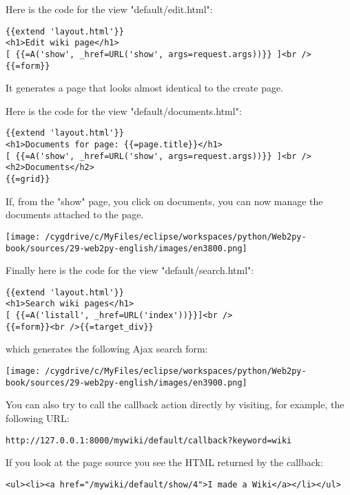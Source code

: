 \documentclass[justified,sixbynine,notoc]{tufte-book}
\begin{document}
\begin{fullwidth}
Here is the code for the view "default/edit.html":
\begin{lstlisting}[keywords={}]
{{extend 'layout.html'}}
<h1>Edit wiki page</h1>
[ {{=A('show', _href=URL('show', args=request.args))}} ]<br />
{{=form}}
\end{lstlisting}

It generates a page that looks almost identical to the create page.

Here is the code for the view "default/documents.html":
\begin{lstlisting}[keywords={}]
{{extend 'layout.html'}}
<h1>Documents for page: {{=page.title}}</h1>
[ {{=A('show', _href=URL('show', args=request.args))}} ]<br />
<h2>Documents</h2>
{{=grid}}
\end{lstlisting}

If, from the "show" page, you click on documents, you can now manage the documents attached to the page.


\goodbreak\begin{center}\texttt{[image: /cygdrive/c/MyFiles/eclipse/workspaces/python/Web2py-book/sources/29-web2py-english/images/en3800.png]}\end{center}


Finally here is the code for the view "default/search.html":
\begin{lstlisting}[keywords={}]
{{extend 'layout.html'}}
<h1>Search wiki pages</h1>
[ {{=A('listall', _href=URL('index'))}}]<br />
{{=form}}<br />{{=target_div}}
\end{lstlisting}
\noindent which generates the following Ajax search form:


\goodbreak\begin{center}\texttt{[image: /cygdrive/c/MyFiles/eclipse/workspaces/python/Web2py-book/sources/29-web2py-english/images/en3900.png]}\end{center}


You can also try to call the callback action directly by visiting, for example, the following URL:
\begin{lstlisting}[keywords={}]
http://127.0.0.1:8000/mywiki/default/callback?keyword=wiki
\end{lstlisting}

If you look at the page source you see the HTML returned by the callback:
\begin{lstlisting}[keywords={}]
<ul><li><a href="/mywiki/default/show/4">I made a Wiki</a></li></ul>
\end{lstlisting}


\end{fullwidth}
\end{document}
